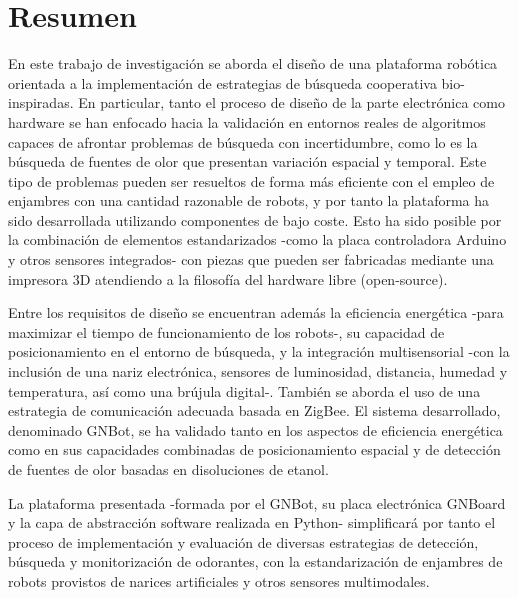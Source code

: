 \chapter*{Resumen}
\vspace*{-1.5cm}





En este trabajo de investigaci\'{o}n se aborda el dise\~{n}o de una plataforma rob\'{o}tica orientada a la implementaci\'{o}n de estrategias de b\'{u}squeda cooperativa bio-inspiradas. En particular, tanto el proceso de dise\~{n}o de la parte electr\'{o}nica como hardware se han enfocado hacia la validaci\'{o}n en entornos reales de algoritmos capaces de afrontar problemas de b\'{u}squeda con incertidumbre, como lo es la b\'{u}squeda de fuentes de olor que presentan variaci\'{o}n espacial y temporal. Este tipo de problemas pueden ser resueltos de forma m\'{a}s eficiente con el empleo de enjambres con una cantidad razonable de robots, y por tanto la plataforma ha sido desarrollada utilizando componentes de bajo coste.
Esto ha sido posible por la combinaci\'{o}n de elementos estandarizados -como la placa controladora Arduino y otros sensores integrados- con piezas que pueden ser fabricadas mediante una impresora 3D atendiendo a la filosof\'{i}a del hardware libre (open-source).


Entre los requisitos de dise\~{n}o se encuentran adem\'{a}s la eficiencia energ\'{e}tica -para maximizar el tiempo de funcionamiento de los robots-, su capacidad de posicionamiento en el entorno de b\'{u}squeda, y la integraci\'{o}n multisensorial -con la inclusi\'{o}n de una nariz electr\'{o}nica, sensores de luminosidad, distancia, humedad y temperatura, as\'{i} como una br\'{u}jula digital-.
Tambi\'{e}n se aborda el uso de una estrategia de comunicaci\'{o}n adecuada basada en ZigBee.
El sistema desarrollado, denominado GNBot, se ha validado tanto en los aspectos de eficiencia energ\'{e}tica como en sus capacidades combinadas de posicionamiento espacial y de detecci\'{o}n de fuentes de olor basadas en disoluciones de etanol.

La plataforma presentada -formada por el GNBot, su placa electr\'{o}nica GNBoard y la capa de abstracci\'{o}n software realizada en Python- simplificar\'{a} por tanto el proceso de implementaci\'{o}n y evaluaci\'{o}n de diversas estrategias de detecci\'{o}n, b\'{u}squeda y monitorizaci\'{o}n de odorantes, con la estandarizaci\'{o}n de enjambres de robots provistos de narices artificiales y otros sensores multimodales.


